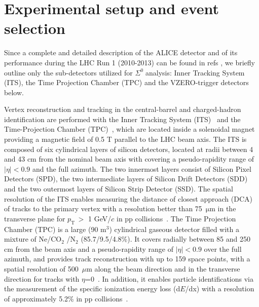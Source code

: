 \documentclass[ALICE,manyauthors]{cernphprep}
\newcommand{\sig}{\ensuremath{\Sigma^0  \; }}
\newcommand{\pt}{\ensuremath{p_{\mathrm{T}\; }}}
\begin{document}
 \section{ Experimental setup and event selection}
 \label{sec:exp}
 
Since a complete and detailed description of the ALICE detector and of its performance 
 during the LHC Run 1 (2010-2013) can be found in refs \cite{cite:ALICE,cite:ALICEPerformance}, 
 we briefly outline only the sub-detectors utilized for \sig analysis:
Inner Tracking System (ITS), the Time Projection Chamber (TPC) and the VZERO-trigger detectors below. 

Vertex reconstruction and tracking in the central-barrel  and charged-hadron identification are performed with the
Inner Tracking System (ITS)~\cite{cite:ALICE} and the Time-Projection Chamber (TPC)~\cite{cite:TPC}, 
which are located inside a solenoidal magnet providing a magnetic field of 0.5 T parallel to the LHC beam axis. 
The ITS is composed of six cylindrical layers of silicon detectors, located at radii between 4 and 43 cm from
the nominal beam axis with covering a pseudo-rapidity range of $|\eta|<0.9$ and the full azimuth. The two innermost layers
consist of Silicon Pixel Detectors (SPD), the two intermediate layers of Silicon Drift Detectors (SDD) and the two outermost
layers of Silicon Strip Detector (SSD). The spatial resolution of the ITS enables measuring the distance of closest approach 
(DCA) of tracks to the primary vertex with a resolution better than 75~$\mathrm{\mu}$m in the transverse plane for \pt $>$ 
1 GeV/$c$ in pp collisions~\cite{cite:Xi_c}. 
The Time Projection Chamber (TPC) is a large (90 m$^3$)
cylindrical gaseous detector filled with a mixture of Ne/CO$_2$ /N$_2$ (85.7/9.5/4.8\%). It covers radially between 85 and 250 cm from the 
beam axis and a pseudo-rapidity range of $|\eta| < 0.9$ over the full azimuth, and provides track reconstruction with up to 
159 space points, with a spatial resolution of 500~$\mu$m along the beam direction and in the transverse direction for tracks 
with $\eta$=0~\cite{cite:TPC}. In addition, it enables particle identifications via the measurement of the specific 
ionization energy loss (d$E$/dx) with a resolution of approximately 5.2\% in pp collisions~\cite{cite:ALICEPerformance}.
\end{document}
